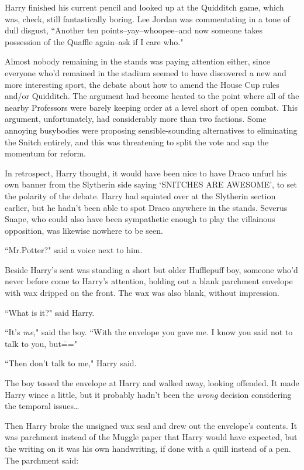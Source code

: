 Harry finished his current pencil and looked up at the Quidditch game, which was, check, still fantastically boring. Lee Jordan was commentating in a tone of dull disgust, ``Another ten points\---yay\---whoopee\---and now someone takes possession of the Quaffle again\---ask if I care who."

Almost nobody remaining in the stands was paying attention either, since everyone who'd remained in the stadium seemed to have discovered a new and more interesting sport, the debate about how to amend the House Cup rules and/or Quidditch. The argument had become heated to the point where all of the nearby Professors were barely keeping order at a level short of open combat. This argument, unfortunately, had considerably more than two factions. Some annoying busybodies were proposing sensible-sounding alternatives to eliminating the Snitch entirely, and this was threatening to split the vote and sap the momentum for reform.

In retrospect, Harry thought, it would have been nice to have Draco unfurl his own banner from the Slytherin side saying `SNITCHES ARE AWESOME', to set the polarity of the debate. Harry had squinted over at the Slytherin section earlier, but he hadn't been able to spot Draco anywhere in the stands. Severus Snape, who could also have been sympathetic enough to play the villainous opposition, was likewise nowhere to be seen.

``Mr.\?Potter?" said a voice next to him.

Beside Harry's seat was standing a short but older Hufflepuff boy, someone who'd never before come to Harry's attention, holding out a blank parchment envelope with wax dripped on the front. The wax was also blank, without impression.

``What is it?" said Harry.

``It's \emph{me}," said the boy. ``With the envelope you gave me. I know you said not to talk to you, but\==="

``Then don't talk to me," Harry said.

The boy tossed the envelope at Harry and walked away, looking offended. It made Harry wince a little, but it probably hadn't been the \emph{wrong} decision considering the temporal issues{\ldots}

Then Harry broke the unsigned wax seal and drew out the envelope's contents. It was parchment instead of the Muggle paper that Harry would have expected, but the writing on it was his own handwriting, if done with a quill instead of a pen. The parchment said:

